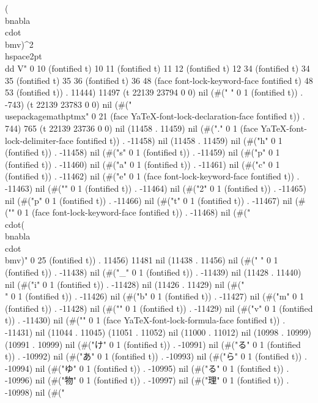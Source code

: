  (\\bnabla\\cdot\\bm{v})^2 \\hspace{2pt}\\dd V" 0 10 (fontified t) 10 11 (fontified t) 11 12 (fontified t) 12 34 (fontified t) 34 35 (fontified t) 35 36 (fontified t) 36 48 (face font-lock-keyword-face fontified t) 48 53 (fontified t)) . 11444) 11497 (t 22139 23794 0 0) nil (#("
" 0 1 (fontified t)) . -743) (t 22139 23783 0 0) nil (#("\\usepackage{mathptmx}" 0 21 (face YaTeX-font-lock-declaration-face fontified t)) . 744) 765 (t 22139 23736 0 0) nil (11458 . 11459) nil (#("." 0 1 (face YaTeX-font-lock-delimiter-face fontified t)) . -11458) nil (11458 . 11459) nil (#("h" 0 1 (fontified t)) . -11458) nil (#("s" 0 1 (fontified t)) . -11459) nil (#("p" 0 1 (fontified t)) . -11460) nil (#("a" 0 1 (fontified t)) . -11461) nil (#("c" 0 1 (fontified t)) . -11462) nil (#("e" 0 1 (face font-lock-keyword-face fontified t)) . -11463) nil (#("{" 0 1 (fontified t)) . -11464) nil (#("2" 0 1 (fontified t)) . -11465) nil (#("p" 0 1 (fontified t)) . -11466) nil (#("t" 0 1 (fontified t)) . -11467) nil (#("}" 0 1 (face font-lock-keyword-face fontified t)) . -11468) nil (#("\\cdot(\\bnabla\\cdot\\bm{v})" 0 25 (fontified t)) . 11456) 11481 nil (11438 . 11456) nil (#(" " 0 1 (fontified t)) . -11438) nil (#("_" 0 1 (fontified t)) . -11439) nil (11428 . 11440) nil (#("i" 0 1 (fontified t)) . -11428) nil (11426 . 11429) nil (#("\\" 0 1 (fontified t)) . -11426) nil (#("b" 0 1 (fontified t)) . -11427) nil (#("m" 0 1 (fontified t)) . -11428) nil (#("{" 0 1 (fontified t)) . -11429) nil (#("v" 0 1 (fontified t)) . -11430) nil (#("}" 0 1 (face YaTeX-font-lock-formula-face fontified t)) . -11431) nil (11044 . 11045) (11051 . 11052) nil (11000 . 11012) nil (10998 . 10999) (10991 . 10999) nil (#("け" 0 1 (fontified t)) . -10991) nil (#("る" 0 1 (fontified t)) . -10992) nil (#("あ" 0 1 (fontified t)) . -10993) nil (#("ら" 0 1 (fontified t)) . -10994) nil (#("ゆ" 0 1 (fontified t)) . -10995) nil (#("る" 0 1 (fontified t)) . -10996) nil (#("物" 0 1 (fontified t)) . -10997) nil (#("理" 0 1 (fontified t)) . -10998) nil (#("

